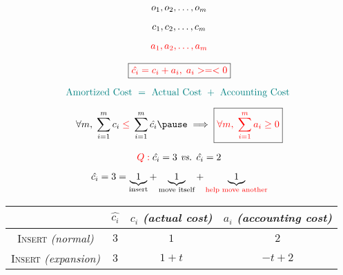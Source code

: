 
\begin{frame}{}
  \centerline{}

\end{frame}

\begin{frame}{}
  \begin{gather*}
    o_1, o_2, \ldots, o_m \\[5pt]
    c_1, c_2, \ldots, c_m \\[5pt]
    \textcolor{red}{a_1, a_2, \ldots, a_m}
  \end{gather*}

  \pause
  \vspace{-0.30cm}
  \[
    \boxed{\textcolor{red}{\hat{c_i} = c_i + a_i, \; a_i >=< 0}}
  \]

  \[
    \textcolor{teal}{\text{Amortized Cost } = \text{ Actual Cost } + \text{ Accounting Cost }}
  \]

  \pause
  \[
    \forall m,\; \sum_{i=1}^{m} c_i \red{\;\le\;} \sum_{i=1}^{m} \hat{c_i} \pause \implies \boxed{\red{\forall m,\; \sum_{i=1}^{m} a_i \geq 0}}
  \]

  \pause
  \begin{center}
    {\large {}}
  \end{center}
\end{frame}

\begin{frame}{}
  \centerline{}

  \[
    \textcolor{red}{Q:}\; \hat{c_i} = 3 \text{\emph{ vs. }} \hat{c_i} = 2
  \]

  \pause
  \[
    \hat{c_i} = 3 = \underbrace{1}_{\textrm{insert}} +
    \underbrace{1}_{\textrm{move itself}} + \underbrace{1}_{\textrm{\textcolor{red}{help move another}}}
  \]

  \pause
  \vspace{0.30cm}
  \begin{table}
    \begin{tabular}{c|ccc}
      & $\hat{c_i}$ & $c_i$ {\it (actual cost)} & $a_i$ {\it (accounting cost)}
      \\ \hline
      \textsc{Insert} {\it (normal)} & $3$ & $1$ & $2$\\
      \textsc{Insert} {\it (expansion)} & $3$ & $1 + t$ & $-t + 2$
    \end{tabular}
  \end{table}
\end{frame}

